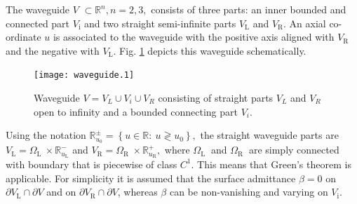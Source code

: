 \documentclass[numreferences]{kluwer}
\begin{document}
The waveguide $V$ $\subset\mathbb{R}^{n},n=2,3,$ consists of three
parts: an inner bounded and connected part $V_{\text{i}}$ and two
straight semi-infinite parts $V_{\text{L}}$ and $V_{\text{R}}$. An
axial co-ordinate $u$ is associated to the waveguide with the positive
axis aligned with $V_{\text{R}}$ and the negative with $V_{\text{L}}.$
Fig.  \ref{fig:wg1} depicts this waveguide schematically.%
\begin{figure}[htb]
  \centering
  \texttt{[image: waveguide.1]}
  \caption{Waveguide $V=V_L\cup V_i\cup V_R$ consisting of straight
    parts $V_L$ and $V_R$ open to infinity and a bounded connecting
    part $V_i$.}
  \label{fig:wg1}
\end{figure}
Using the notation $\mathbb{R}_{u_0}^{\pm}=\left\{ u\in\mathbb{R}:\
  u\gtrless u_{0}\right\} ,$ the straight waveguide parts are
$V_{\text{L}%
}=\Omega_{\text{L }}\times\mathbb{R}_{u_{\text{L}}}^{-}$ and
$V_{\text{R}%
}=\Omega_{\text{R }}\times\mathbb{R}_{u_{\text{R}}}^{+},$ where
$\Omega _{\text{L }}$ and $\Omega_{\text{R }}$ are simply connected
with boundary that is piecewise of class $C^{1}.$ This means that
Green's theorem is applicable.  For simplicity it is assumed that the
surface admittance $\beta=0$ on $\partial V_{\text{L}}\cap\partial V$
and on $\partial V_{\text{R}}\cap\partial V$, whereas $\beta$ can be
non-vanishing and varying on $V_{\text{i}}.$
\end{document}
